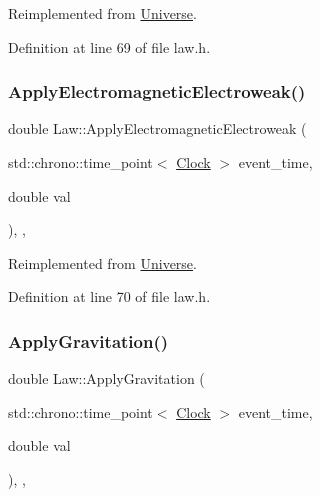Reimplemented from \mbox{\hyperlink{class_universe_a1f787da78fa196ba635db21a9e91dabb}{Universe}}.



Definition at line 69 of file law.\+h.

\mbox{\label{class_law_a4485046db890a95cea16573042a4f4f6}} 
\subsubsection{\texorpdfstring{Apply\+Electromagnetic\+Electroweak()}{ApplyElectromagneticElectroweak()}}
{\footnotesize\ttfamily double Law\+::\+Apply\+Electromagnetic\+Electroweak (\begin{DoxyParamCaption}\item[{std\+::chrono\+::time\+\_\+point$<$ \mbox{\hyperlink{universe_8h_a0ef8d951d1ca5ab3cfaf7ab4c7a6fd80}{Clock}} $>$}]{event\+\_\+time,  }\item[{double}]{val }\end{DoxyParamCaption})\hspace{0.3cm}{\ttfamily [inline]}, {\ttfamily [final]}, {\ttfamily [virtual]}}



Reimplemented from \mbox{\hyperlink{class_universe_a4c36c1ab30db993307f88363dde5e8c5}{Universe}}.



Definition at line 70 of file law.\+h.

\mbox{\label{class_law_a04efdc724335219ab0affdcffb55eea2}} 
\subsubsection{\texorpdfstring{Apply\+Gravitation()}{ApplyGravitation()}}
{\footnotesize\ttfamily double Law\+::\+Apply\+Gravitation (\begin{DoxyParamCaption}\item[{std\+::chrono\+::time\+\_\+point$<$ \mbox{\hyperlink{universe_8h_a0ef8d951d1ca5ab3cfaf7ab4c7a6fd80}{Clock}} $>$}]{event\+\_\+time,  }\item[{double}]{val }\end{DoxyParamCaption})\hspace{0.3cm}{\ttfamily [inline]}, {\ttfamily [final]}, {\ttfamily [virtual]}}



